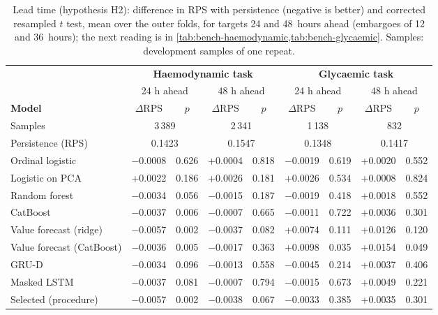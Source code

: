 \begin{table}[htbp]
\centering\footnotesize\setlength{\tabcolsep}{3.5pt}
\caption{Lead time (hypothesis H2): difference in RPS with persistence (negative is better) and corrected resampled $t$ test, mean over the outer folds, for targets 24 and 48~hours ahead (embargoes of 12 and 36~hours); the next reading is in \cref{tab:bench-haemodynamic,tab:bench-glycaemic}. Samples: development samples of one repeat.}\label{tab:leads}
\begin{tabular}{@{}lcccccccc@{}}
\toprule
 & \multicolumn{4}{c}{\textbf{Haemodynamic task}} & \multicolumn{4}{c}{\textbf{Glycaemic task}} \\
\cmidrule(lr){2-5}\cmidrule(lr){6-9}
 & \multicolumn{2}{c}{24 h ahead} & \multicolumn{2}{c}{48 h ahead} & \multicolumn{2}{c}{24 h ahead} & \multicolumn{2}{c}{48 h ahead} \\
\cmidrule(lr){2-3}\cmidrule(lr){4-5}\cmidrule(lr){6-7}\cmidrule(lr){8-9}
\textbf{Model} & $\Delta$RPS & $p$ & $\Delta$RPS & $p$ & $\Delta$RPS & $p$ & $\Delta$RPS & $p$ \\
\midrule
Samples & \multicolumn{2}{c}{3\,389} & \multicolumn{2}{c}{2\,341} & \multicolumn{2}{c}{1\,138} & \multicolumn{2}{c}{832} \\
Persistence (RPS) & \multicolumn{2}{c}{0.1423} & \multicolumn{2}{c}{0.1547} & \multicolumn{2}{c}{0.1348} & \multicolumn{2}{c}{0.1417} \\
\midrule
Ordinal logistic & $-$0.0008 & 0.626 & +0.0004 & 0.818 & $-$0.0019 & 0.619 & +0.0020 & 0.552 \\
Logistic on PCA & +0.0022 & 0.186 & +0.0026 & 0.181 & +0.0026 & 0.534 & +0.0008 & 0.824 \\
Random forest & $-$0.0034 & 0.056 & $-$0.0015 & 0.187 & $-$0.0019 & 0.418 & +0.0018 & 0.552 \\
CatBoost & $-$0.0037 & 0.006 & $-$0.0007 & 0.665 & $-$0.0011 & 0.722 & +0.0036 & 0.301 \\
Value forecast (ridge) & $-$0.0057 & 0.002 & $-$0.0037 & 0.082 & +0.0074 & 0.111 & +0.0126 & 0.120 \\
Value forecast (CatBoost) & $-$0.0036 & 0.005 & $-$0.0017 & 0.363 & +0.0098 & 0.035 & +0.0154 & 0.049 \\
GRU-D & $-$0.0034 & 0.096 & $-$0.0013 & 0.558 & $-$0.0045 & 0.214 & +0.0037 & 0.406 \\
Masked LSTM & $-$0.0037 & 0.081 & $-$0.0007 & 0.794 & $-$0.0015 & 0.673 & +0.0049 & 0.221 \\
Selected (procedure) & $-$0.0057 & 0.002 & $-$0.0038 & 0.067 & $-$0.0033 & 0.385 & +0.0035 & 0.301 \\
\bottomrule
\end{tabular}
\end{table}
